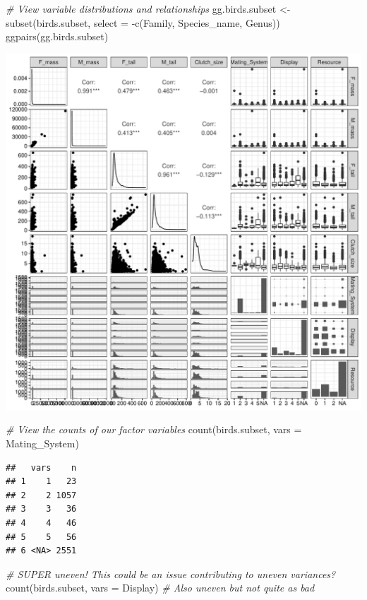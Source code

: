 \documentclass[
  12pt,
]{article}
\newenvironment{Shaded}{\begin{snugshade}}{\end{snugshade}}
\newcommand{\AttributeTok}[1]{\textcolor[rgb]{0.77,0.63,0.00}{#1}}
\newcommand{\CommentTok}[1]{\textcolor[rgb]{0.56,0.35,0.01}{\textit{#1}}}
\newcommand{\FunctionTok}[1]{\textcolor[rgb]{0.00,0.00,0.00}{#1}}
\newcommand{\NormalTok}[1]{#1}
\newcommand{\OtherTok}[1]{\textcolor[rgb]{0.56,0.35,0.01}{#1}}
\newcommand{\SpecialCharTok}[1]{\textcolor[rgb]{0.00,0.00,0.00}{#1}}
\begin{document}
\begin{Shaded}
\begin{Highlighting}[]
\CommentTok{\# View variable distributions and relationships}
\NormalTok{gg.birds.subset }\OtherTok{\textless{}{-}} \FunctionTok{subset}\NormalTok{(birds.subset, }\AttributeTok{select =} \SpecialCharTok{{-}}\FunctionTok{c}\NormalTok{(Family, Species\_name, Genus))}
\FunctionTok{ggpairs}\NormalTok{(gg.birds.subset)}
\end{Highlighting}
\end{Shaded}

\includegraphics{Project_Code_files/figure-latex/gg exploration-1.pdf}

\begin{Shaded}
\begin{Highlighting}[]
\CommentTok{\# View the counts of our factor variables}
\FunctionTok{count}\NormalTok{(birds.subset, }\AttributeTok{vars =}\NormalTok{ Mating\_System) }
\end{Highlighting}
\end{Shaded}

\begin{verbatim}
##   vars    n
## 1    1   23
## 2    2 1057
## 3    3   36
## 4    4   46
## 5    5   56
## 6 <NA> 2551
\end{verbatim}

\begin{Shaded}
\begin{Highlighting}[]
\CommentTok{\# SUPER uneven! This could be an issue contributing to uneven variances?}
\FunctionTok{count}\NormalTok{(birds.subset, }\AttributeTok{vars =}\NormalTok{ Display) }\CommentTok{\# Also uneven but not quite as bad}
\end{Highlighting}
\end{Shaded}
\end{document}
